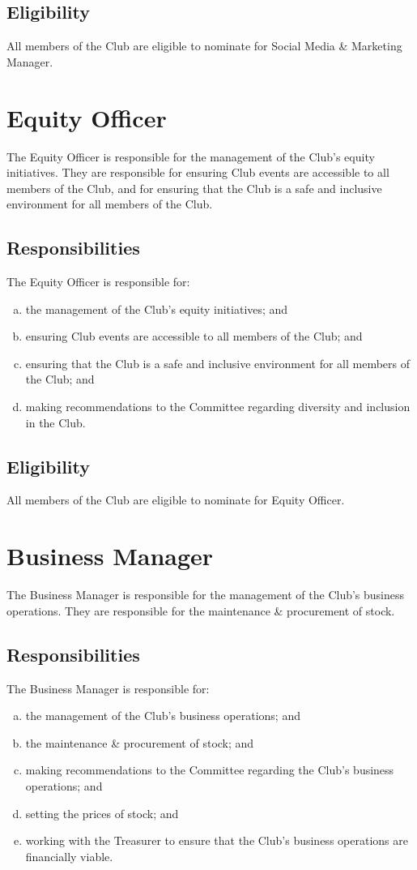 \documentclass[11pt]{report}
\begin{document}
\subsection{Eligibility}
All members of the Club are eligible to nominate for Social Media \& Marketing Manager.

\section{Equity Officer}
The Equity Officer is responsible for the management of the Club's equity initiatives. They are responsible for ensuring Club events are accessible to all members of the Club, and for ensuring that the Club is a safe and inclusive environment for all members of the Club.
\subsection{Responsibilities}
The Equity Officer is responsible for:
\begin{enumerate}[(a)]
    \item the management of the Club's equity initiatives; and
    \item ensuring Club events are accessible to all members of the Club; and
    \item ensuring that the Club is a safe and inclusive environment for all members of the Club; and
    \item making recommendations to the Committee regarding diversity and inclusion in the Club.
\end{enumerate}
\subsection{Eligibility}
All members of the Club are eligible to nominate for Equity Officer.

\section{Business Manager}
The Business Manager is responsible for the management of the Club's business operations. They are responsible for the maintenance \& procurement of stock.
\subsection{Responsibilities}
The Business Manager is responsible for:
\begin{enumerate}[(a)]
    \item the management of the Club's business operations; and
    \item the maintenance \& procurement of stock; and
    \item making recommendations to the Committee regarding the Club's business operations; and
    \item setting the prices of stock; and
    \item working with the Treasurer to ensure that the Club's business operations are financially viable.
\end{enumerate}
\end{document}
